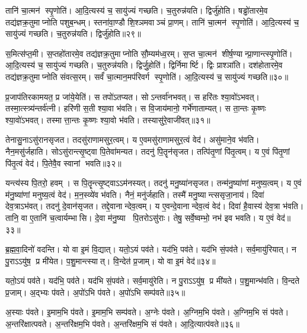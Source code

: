 तानि॑ चा॒त्मन॑ स्पृ॒णोति॑।
आ॒दि॒त्यस्य॑ च॒ सायु॑ज्यं गच्छति।
च॒तुरुन्न॑यति।
द्विर्जु॑होति।
षड्ढो॑तारमे॒व तद्य॑ज्ञक्र॒तुमाप्नोति पशुब॒न्धम्।
स्तना॑वा॒ण्डौ शि॒श्ञमवाञ्चं प्रा॒णम्।
तानि॑ चा॒त्मन॑ स्पृ॒णोति॑।
आ॒दि॒त्यस्य॑ च॒ सायु॑ज्यं गच्छति।
च॒तुरुन्न॑यति।
द्विर्जु॑होति॥२९॥

स॒मित्स॑प्त॒मी।
स॒प्तहो॑तारमे॒व तद्य॑ज्ञक्र॒तुमाप्नोति सौ॒म्यम॑ध्व॒रम्।
स॒प्त चा॒त्मन॑ शीर्\mbox{}ष॒ण्यान्प्रा॒णान्त्स्पृ॒णोति॑।
आ॒दि॒त्यस्य॑ च॒ सायु॑ज्यं गच्छति।
च॒तुरुन्न॑यति।
द्विर्जु॒होति॑।
द्विर्निमार्ष्टि।
द्विः प्राश्ञा॑ति।
दश॑होतारमे॒व तद्य॑ज्ञक्र॒तुमाप्नोति संवत्स॒रम्।
सर्वं॑ चा॒त्मान॒मप॑रिवर्ग स्पृ॒णोति॑।
आ॒दि॒त्यस्य॑ च॒ सायु॑ज्यं गच्छति॥३०॥\anuvakamend[अ॒ग्नि॒हो॒त्रं म॒ज्जान॒न्द्विर्जु॑हो॒त्यप॑रिवर्ग स्पृ॒णोत्येकं च]

प्र॒जाप॑तिरकामयत॒ प्र जा॑ये॒येति॑।
स तपो॑ऽतप्यत।
सोऽन्तर्वा॑नभवत्।
स हरि॑तः श्या॒वो॑ऽभवत्।
तस्मा॒त्स्त्र्य॑न्तर्व॑त्नी।
हरि॑णी स॒ती श्या॒वा भ॑वति।
स वि॒जाय॑मानो॒ गर्भे॑णाताम्यत्।
स ता॒न्तः कृ॒ष्णः श्या॒वो॑ऽभवत्।
तस्मात्ता॒न्तः कृ॒ष्णः श्या॒वो भ॑वति।
तस्यासु॑रे॒वाजी॑वत्॥३१॥

तेनासु॒नाऽसु॑रानसृजत।
तदसु॑राणामसुर॒त्वम्।
य ए॒वमसु॑राणामसुर॒त्वं वेद॑।
असु॑माने॒व भ॑वति।
नैन॒मसु॑र्जहाति।
सोऽसु॑रान्त्सृ॒ष्ट्वा पि॒तेवा॑मन्यत।
तदनु॑ पि॒तॄन॑सृजत।
तत्पि॑तृ॒णां पि॑तृ॒त्वम्।
य ए॒वं पि॑तृ॒णां पि॑तृ॒त्वं वेद॑।
पि॒तेवै॒व स्वानां भवति॥३२॥

यन्त्य॑स्य पि॒तरो॒ हवम्।
स पि॒तॄन्त्सृ॒ष्ट्वाऽऽम॑नस्यत्।
तदनु॑ मनु॒ष्या॑नसृजत।
तन्म॑नु॒ष्या॑णां मनुष्य॒त्वम्।
य ए॒वं म॑नु॒ष्या॑णां मनुष्य॒त्वं वेद॑।
म॒न॒स्व्ये॑व भ॑वति।
नैनं॒ मनु॑र्जहाति।
तस्मै॑ मनु॒ष्यान्त्ससृजा॒नाय॑।
दिवा॑ देव॒त्राऽभ॑वत्।
तदनु॑ दे॒वान॑सृजत।
तद्दे॒वानान्देव॒त्वम्।
य ए॒वन्दे॒वानान्देव॒त्वं वेद॑।
दिवा॑ है॒वास्य॑ देव॒त्रा भ॑वति।
तानि॒ वा ए॒तानि॑ च॒त्वार्यम्भासि।
दे॒वा म॑नु॒ष्या पि॒तरोऽसु॑राः।
तेषु॒ सर्वे॒ष्वम्भो॒ नभ॑ इव भवति।
य ए॒वं वेद॑॥३३॥\anuvakamend[अ॒जी॒व॒त्स्वानां भवति दे॒वान॑सृजत स॒प्त च॑]

ब्र॒ह्म॒वा॒दिनो॑ वदन्ति।
यो वा इ॒मं वि॒द्यात्।
यतो॒ऽयं पव॑ते।
यद॑भि॒ पव॑ते।
यद॑भि सं॒पव॑ते।
सर्व॒मायु॑रियात्।
न पु॒राऽऽयु॑ष॒ प्र मी॑येत।
प॒शु॒मान्त्स्यात्।
वि॒न्देत॑ प्र॒जाम्।
यो वा इ॒मं वेद॑॥३४॥

यतो॒ऽयं पव॑ते।
यद॑भि॒ पव॑ते।
यद॑भि सं॒पव॑ते।
सर्व॒मायु॑रेति।
न पु॒राऽऽयु॑ष॒ प्र मी॑यते।
प॒शु॒मान्भ॑वति।
वि॒न्दते प्र॒जाम्।
अ॒द्भ्यः प॑वते।
अ॒पो॑ऽभि प॑वते।
अ॒पो॑ऽभि सम्प॑वते॥३५॥

अ॒स्याः प॑वते।
इ॒माम॒भि प॑वते।
इ॒माम॒भि सम्प॑वते।
अ॒ग्नेः प॑वते।
अ॒ग्निम॒भि प॑वते।
अ॒ग्निम॒भि सं प॑वते।
अ॒न्तरि॑क्षात्पवते।
अ॒न्तरि॑क्षम॒भि प॑वते।
अ॒न्तरि॑क्षम॒भि सं प॑वते।
आ॒दि॒त्यात्प॑वते॥३६॥

